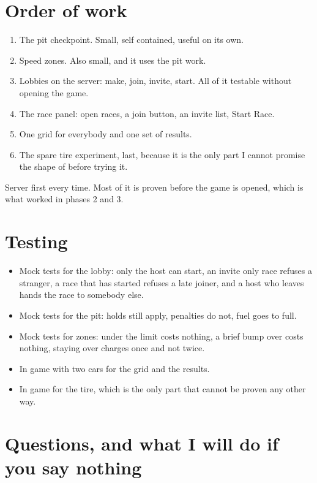 \documentclass[11pt,a4paper]{article}
\begin{document}
\section{Order of work}

\begin{enumerate}
  \item The pit checkpoint. Small, self contained, useful on its own.
  \item Speed zones. Also small, and it uses the pit work.
  \item Lobbies on the server: make, join, invite, start. All of it testable
        without opening the game.
  \item The race panel: open races, a join button, an invite list, Start Race.
  \item One grid for everybody and one set of results.
  \item The spare tire experiment, last, because it is the only part I cannot
        promise the shape of before trying it.
\end{enumerate}

Server first every time. Most of it is proven before the game is opened, which
is what worked in phases 2 and 3.

\section{Testing}

\begin{itemize}
  \item Mock tests for the lobby: only the host can start, an invite only race
        refuses a stranger, a race that has started refuses a late joiner, and
        a host who leaves hands the race to somebody else.
  \item Mock tests for the pit: holds still apply, penalties do not, fuel goes
        to full.
  \item Mock tests for zones: under the limit costs nothing, a brief bump over
        costs nothing, staying over charges once and not twice.
  \item In game with two cars for the grid and the results.
  \item In game for the tire, which is the only part that cannot be proven any
        other way.
\end{itemize}

\section{Questions, and what I will do if you say nothing}
\end{document}

